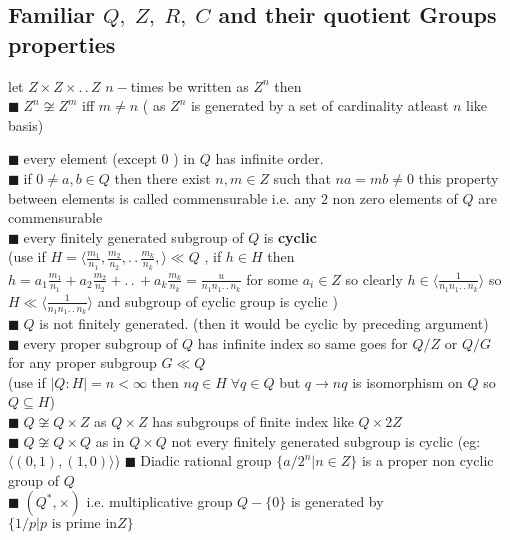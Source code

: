 \documentclass[11pt]{extarticle}
\newcommand{\ra}{\rightarrow}
\newcommand{\w}[1]{\text{#1}}
\newcommand{\ck}{.\,.\,}
\newcommand{\snote}[1]{{\footnotesize(#1)}}
\newcommand{\y}{$\blacksquare\;$}
\newcommand{\gen}[1]{\langle #1 \rangle}
\newcommand{\tbx}[2][]{
	\begin{tcolorbox}[enhanced,breakable,size=small,colback=black!2!white,title={#1},arc is angular, arc=1.5mm,drop fuzzy shadow]
		#2
	\end{tcolorbox}
}
\newcommand{\tm}{\times}
\begin{document}
\begin{multicols}{2}
\subsection{\small Familiar $ Q,\; Z,\; R,\; C $ and their quotient Groups properties }
\tbx[Z]{ let $ Z\tm Z\tm \ck Z $ $ n-$times be written as $ Z^n $ then\\
\y $ Z^n\not\cong Z^m $ iff $ m\neq n $ \snote{ as $ Z^n $ is generated by a set of cardinality atleast $ n $ like basis}
 }
\tbx[$ Q $  ]{
\y every element \snote{except $ 0 $ } in $ Q $ has infinite order.\\
\y if $ 0\neq a,b \in Q $  then there exist $ n,m\in Z $ such that $ na=mb \neq 0$ this property between elements is called commensurable i.e. any $ 2 $ non zero elements of $ Q $ are commensurable\\
\y every finitely generated subgroup of $ Q$ is \textbf{cyclic}\\
\snote{use if $ H=\gen{\frac{ m_1 }{n_1},\frac{ m_2}{n_2},\ck \frac{ m_k }{n_k},} \ll Q   $ , if $ h\in H  $ then 
	$ h= a_1\frac{ m_1 }{n_1}+a_2\frac{ m_2}{n_2}+\ck+a_k \frac{ m_k }{n_k}= \frac{ u }{n_1n_1\ck n_k} $ for some $ a_i\in Z $  so clearly $ h\in \gen{\frac{ 1 }{n_1n_1\ck n_k} } $ so $ H\ll  \gen{\frac{ 1 }{n_1n_1\ck n_k}}$ and subgroup of cyclic group is cyclic }\\
\y $ Q $ is not finitely generated. \snote{then it would be cyclic by preceding argument}\\
\y every proper subgroup of $ Q $ has infinite index so same goes for $ Q/Z $ or $ Q/G $ for any proper subgroup $ G\ll Q $   \\
\snote{use if $ |Q:H|=n<\infty $  then $ nq\in H \; \forall q \in Q$ but $ q\ra nq $ is isomorphism on $ Q $ so $ Q\subseteq H $}\\
\y $ Q\not\cong Q\times Z $ as $ Q\times Z  $ has subgroups of finite index like $ Q\times 2Z  $ \\
\y $ Q\not\cong Q\times Q$ as in $ Q\times Q  $ not every finitely generated subgroup is cyclic \snote{eg: $\gen{(0,1),(1,0)}$}
\y Diadic rational group $ \{a/2^n|n\in Z\} $ is a proper non cyclic group of $ Q $ \\
\y $ (Q^*,\tm) $ i.e. multiplicative group $Q-\{0\} $ is generated by $ \{1/p|p \w{ is prime in} Z\} $ }


\end{multicols}
\end{document}
